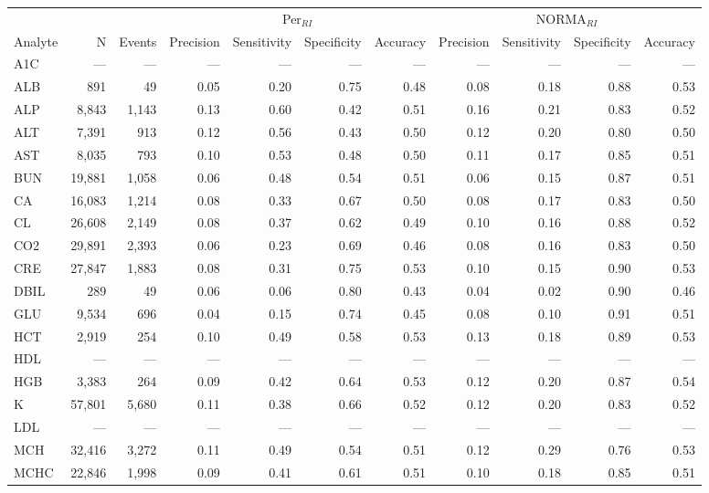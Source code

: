 \begin{table}[ht]
\centering
\footnotesize
\begin{tabular}{lrrrrrrrrrr}
\toprule
 & &  & \multicolumn{4}{c}{Per$_{RI}$} & \multicolumn{4}{c}{NORMA$_{RI}$} \\
\cmidrule(lr){4-7} \cmidrule(lr){8-11}
Analyte & N & Events & Precision & Sensitivity & Specificity & Accuracy & Precision & Sensitivity & Specificity & Accuracy \\
\midrule
A1C & --- & --- & --- & --- & --- & --- & --- & --- & --- & --- \\
ALB & 891 & 49 & 0.05 & 0.20 & 0.75 & 0.48 & 0.08 & 0.18 & 0.88 & 0.53 \\
ALP & 8,843 & 1,143 & 0.13 & 0.60 & 0.42 & 0.51 & 0.16 & 0.21 & 0.83 & 0.52 \\
ALT & 7,391 & 913 & 0.12 & 0.56 & 0.43 & 0.50 & 0.12 & 0.20 & 0.80 & 0.50 \\
AST & 8,035 & 793 & 0.10 & 0.53 & 0.48 & 0.50 & 0.11 & 0.17 & 0.85 & 0.51 \\
BUN & 19,881 & 1,058 & 0.06 & 0.48 & 0.54 & 0.51 & 0.06 & 0.15 & 0.87 & 0.51 \\
CA & 16,083 & 1,214 & 0.08 & 0.33 & 0.67 & 0.50 & 0.08 & 0.17 & 0.83 & 0.50 \\
CL & 26,608 & 2,149 & 0.08 & 0.37 & 0.62 & 0.49 & 0.10 & 0.16 & 0.88 & 0.52 \\
CO2 & 29,891 & 2,393 & 0.06 & 0.23 & 0.69 & 0.46 & 0.08 & 0.16 & 0.83 & 0.50 \\
CRE & 27,847 & 1,883 & 0.08 & 0.31 & 0.75 & 0.53 & 0.10 & 0.15 & 0.90 & 0.53 \\
DBIL & 289 & 49 & 0.06 & 0.06 & 0.80 & 0.43 & 0.04 & 0.02 & 0.90 & 0.46 \\
GLU & 9,534 & 696 & 0.04 & 0.15 & 0.74 & 0.45 & 0.08 & 0.10 & 0.91 & 0.51 \\
HCT & 2,919 & 254 & 0.10 & 0.49 & 0.58 & 0.53 & 0.13 & 0.18 & 0.89 & 0.53 \\
HDL & --- & --- & --- & --- & --- & --- & --- & --- & --- & --- \\
HGB & 3,383 & 264 & 0.09 & 0.42 & 0.64 & 0.53 & 0.12 & 0.20 & 0.87 & 0.54 \\
K & 57,801 & 5,680 & 0.11 & 0.38 & 0.66 & 0.52 & 0.12 & 0.20 & 0.83 & 0.52 \\
LDL & --- & --- & --- & --- & --- & --- & --- & --- & --- & --- \\
MCH & 32,416 & 3,272 & 0.11 & 0.49 & 0.54 & 0.51 & 0.12 & 0.29 & 0.76 & 0.53 \\
MCHC & 22,846 & 1,998 & 0.09 & 0.41 & 0.61 & 0.51 & 0.10 & 0.18 & 0.85 & 0.51 \\

\end{tabular}
\end{table}
